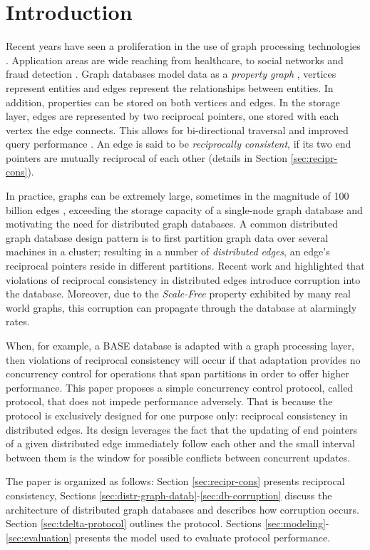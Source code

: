 \section{Introduction}
\label{sec:introduction}

Recent years have seen a proliferation in the use of graph processing technologies \cite{Besta2019}. Application areas are wide reaching from healthcare, to social networks and fraud detection \cite{Eifrem2016}. Graph databases model data as a \textit{property graph} \cite{Robinson2015}, vertices represent entities and edges represent the relationships between entities. In addition, properties can be stored on both vertices and edges. In the storage layer, edges are represented by two reciprocal pointers, one stored with each vertex the edge connects. This allows for bi-directional traversal and improved query performance \cite{Robinson2015}. An edge is said to be \emph{reciprocally consistent}, if its two end pointers are mutually reciprocal of each other (details in Section \ref{sec:recipr-cons}).

In practice, graphs can be extremely large, sometimes in the magnitude of 100 billion edges \cite{Sahu2017}, exceeding the storage capacity of a single-node graph database and motivating the need for distributed graph databases. A common distributed graph database design pattern is to first partition graph data over several machines in a cluster; resulting in a number of \emph{distributed edges}, an edge's reciprocal pointers reside in different partitions. Recent work \cite{Ezhilchelvan2018} and \cite{Webber2019} highlighted that violations of reciprocal consistency in distributed edges introduce corruption into the database. Moreover, due to the \emph{Scale-Free} \cite{ScaleFree} property exhibited by many real world graphs, this corruption can propagate through the database at alarmingly rates.

When, for example, a BASE database \cite{Pritchett2008} is adapted with a graph processing layer, then violations of reciprocal consistency will occur if that adaptation provides no concurrency control for operations that span partitions in order to offer higher performance. This paper proposes a simple concurrency control protocol, called \tDelta protocol, that does not impede performance adversely. That is because the protocol is exclusively designed for one purpose only: reciprocal consistency in distributed edges.  Its design leverages the fact that the updating of end pointers of a given distributed edge immediately follow each other and the small interval between them is the window for possible conflicts between concurrent updates.

The paper is organized as follows: Section \ref{sec:recipr-cons} presents reciprocal consistency, Sections \ref{sec:distr-graph-datab}-\ref{sec:db-corruption} discuss the architecture of distributed graph databases and describes how corruption occurs. Section \ref{sec:tdelta-protocol} outlines the \tDelta protocol. Sections \ref{sec:modeling}-\ref{sec:evaluation} presents the model used to evaluate protocol performance.
